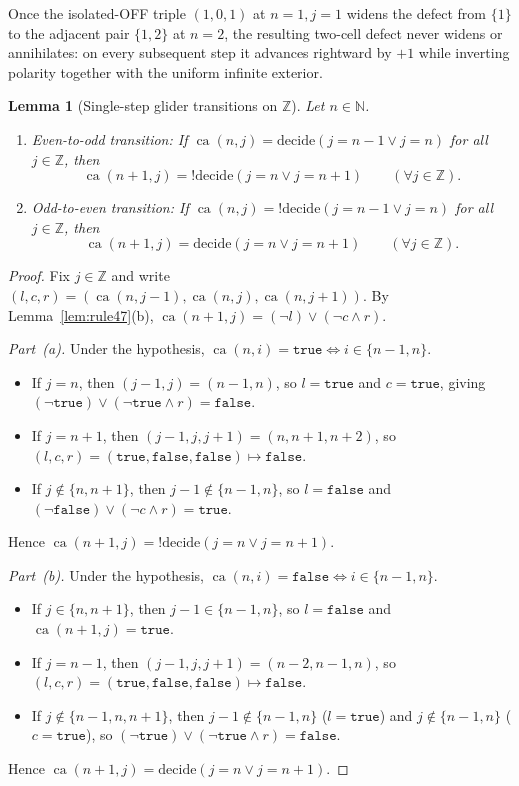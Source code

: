 \documentclass[11pt]{article}
\newtheorem{lemma}[theorem]{Lemma}
\theoremstyle{definition}
\newcommand{\N}{\mathbb{N}}
\newcommand{\Z}{\mathbb{Z}}
\newcommand{\ca}{\operatorname{ca}}
\begin{document}
Once the isolated-OFF triple $(1, 0, 1)$ at $n = 1, j = 1$ widens the defect from $\{1\}$ to the adjacent pair $\{1, 2\}$ at $n = 2$, the resulting two-cell defect never widens or annihilates: on every subsequent step it advances rightward by $+1$ while inverting polarity together with the uniform infinite exterior.

\begin{lemma}[Single-step glider transitions on $\Z$]
\label{lem:glider-steps}
Let $n \in \N$.
\begin{enumerate}
\item[\textup{(a)}] \emph{Even-to-odd transition:} If $\ca(n, j) = \mathrm{decide}(j = n - 1 \lor j = n)$ for all $j \in \Z$, then
\[
\ca(n + 1, j) = !\mathrm{decide}(j = n \lor j = n + 1) \qquad (\forall j \in \Z).
\]
\item[\textup{(b)}] \emph{Odd-to-even transition:} If $\ca(n, j) = !\mathrm{decide}(j = n - 1 \lor j = n)$ for all $j \in \Z$, then
\[
\ca(n + 1, j) = \mathrm{decide}(j = n \lor j = n + 1) \qquad (\forall j \in \Z).
\]
\end{enumerate}
\end{lemma}

\begin{proof}
Fix $j \in \Z$ and write $(l, c, r) = (\ca(n, j - 1), \ca(n, j), \ca(n, j + 1))$. By Lemma~\ref{lem:rule47}(b), $\ca(n + 1, j) = (\neg l) \lor (\neg c \land r)$.

\emph{Part~(a).} Under the hypothesis, $\ca(n, i) = \mathtt{true} \iff i \in \{n - 1, n\}$.
\begin{itemize}
\item If $j = n$, then $(j - 1, j) = (n - 1, n)$, so $l = \mathtt{true}$ and $c = \mathtt{true}$, giving $(\neg \mathtt{true}) \lor (\neg \mathtt{true} \land r) = \mathtt{false}$.
\item If $j = n + 1$, then $(j - 1, j, j + 1) = (n, n + 1, n + 2)$, so $(l, c, r) = (\mathtt{true}, \mathtt{false}, \mathtt{false}) \mapsto \mathtt{false}$.
\item If $j \notin \{n, n + 1\}$, then $j - 1 \notin \{n - 1, n\}$, so $l = \mathtt{false}$ and $(\neg \mathtt{false}) \lor (\neg c \land r) = \mathtt{true}$.
\end{itemize}
Hence $\ca(n + 1, j) = !\mathrm{decide}(j = n \lor j = n + 1)$.

\emph{Part~(b).} Under the hypothesis, $\ca(n, i) = \mathtt{false} \iff i \in \{n - 1, n\}$.
\begin{itemize}
\item If $j \in \{n, n + 1\}$, then $j - 1 \in \{n - 1, n\}$, so $l = \mathtt{false}$ and $\ca(n + 1, j) = \mathtt{true}$.
\item If $j = n - 1$, then $(j - 1, j, j + 1) = (n - 2, n - 1, n)$, so $(l, c, r) = (\mathtt{true}, \mathtt{false}, \mathtt{false}) \mapsto \mathtt{false}$.
\item If $j \notin \{n - 1, n, n + 1\}$, then $j - 1 \notin \{n - 1, n\}$ ($l = \mathtt{true}$) and $j \notin \{n - 1, n\}$ ($c = \mathtt{true}$), so $(\neg \mathtt{true}) \lor (\neg \mathtt{true} \land r) = \mathtt{false}$.
\end{itemize}
Hence $\ca(n + 1, j) = \mathrm{decide}(j = n \lor j = n + 1)$.
\end{proof}
\end{document}
